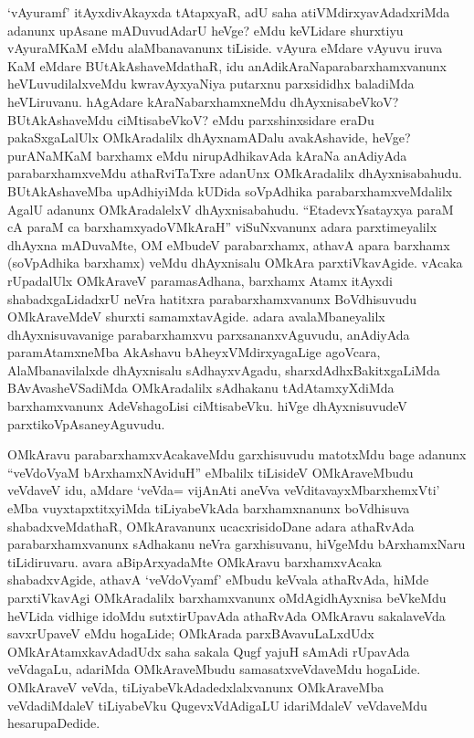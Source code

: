 \begin{artha}
`vAyuramf' itAyxdivAkayxda tAtapxyaR, adU saha atiVMdirxyavAdadxriMda adanunx upAsane mADuvudAdarU heVge? eMdu keVLidare shurxtiyu vAyuraMKaM eMdu alaMbanavanunx tiLiside. vAyura eMdare vAyuvu iruva KaM eMdare BUtAkAshaveMdathaR, idu anAdikAraNaparabarxhamxvanunx heVLuvudilalxveMdu kwravAyxyaNiya putarxnu parxsididhx baladiMda heVLiruvanu. hAgAdare kAraNabarxhamxneMdu dhAyxnisabeVkoV? BUtAkAshaveMdu ciMtisabeVkoV? eMdu parxshinxsidare eraDu pakaSxgaLalUlx OMkAradalilx dhAyxnamADalu avakAshavide, heVge? purANaMKaM barxhamx eMdu nirupAdhikavAda kAraNa anAdiyAda parabarxhamxveMdu athaRviTaTxre adanUnx OMkAradalilx dhAyxnisabahudu. BUtAkAshaveMba upAdhiyiMda kUDida soVpAdhika parabarxhamxveMdalilx AgalU adanunx OMkAradalelxV dhAyxnisabahudu. ``EtadevxYsatayxya paraM cA paraM ca barxhamxyadoVMkAraH'' viSuNxvanunx adara parxtimeyalilx dhAyxna mADuvaMte, OM eMbudeV parabarxhamx, athavA apara barxhamx (soVpAdhika barxhamx) veMdu dhAyxnisalu OMkAra parxtiVkavAgide. vAcaka rUpadalUlx OMkAraveV paramasAdhana, barxhamx Atamx itAyxdi shabadxgaLidadxrU neVra hatitxra parabarxhamxvanunx BoVdhisuvudu OMkAraveMdeV shurxti samamxtavAgide. adara avalaMbaneyalilx dhAyxnisuvavanige parabarxhamxvu parxsananxvAguvudu, anAdiyAda paramAtamxneMba AkAshavu bAheyxVMdirxyagaLige agoVcara, AlaMbanavilalxde dhAyxnisalu sAdhayxvAgadu, sharxdAdhxBakitxgaLiMda BAvAvasheVSadiMda OMkAradalilx sAdhakanu tAdAtamxyXdiMda barxhamxvanunx AdeVshagoLisi ciMtisabeVku. hiVge dhAyxnisuvudeV parxtikoVpAsaneyAguvudu.
\end{artha}

\begin{artha}
OMkAravu  parabarxhamxvAcakaveMdu garxhisuvudu matotxMdu bage adanunx  ``veVdoV\s yaM bArxhamxNAviduH'' eMbalilx tiLisideV OMkAraveMbudu veVdaveV idu, aMdare `veVda= vijAnAti aneVva veVditavayxMbarxhemxVti' eMba vuyxtapxtitxyiMda tiLiyabeVkAda barxhamxnanunx boVdhisuva shabadxveMdathaR, OMkAravanunx ucacxrisidoDane adara athaRvAda parabarxhamxvanunx sAdhakanu neVra garxhisuvanu, hiVgeMdu bArxhamxNaru tiLidiruvaru. avara aBipArxyadaMte OMkAravu barxhamxvAcaka shabadxvAgide, athavA `veVdoV\s yamf' eMbudu keVvala athaRvAda, hiMde parxtiVkavAgi OMkAradalilx barxhamxvanunx oMdAgidhAyxnisa beVkeMdu heVLida vidhige idoMdu sutxtirUpavAda athaRvAda OMkAravu sakalaveVda savxrUpaveV eMdu hogaLide; OMkArada parxBAvavuLaLxdUdx OMkArAtamxkavAdadUdx saha sakala Qugf yajuH sAmAdi rUpavAda veVdagaLu, adariMda OMkAraveMbudu samasatxveVdaveMdu hogaLide. OMkAraveV veVda, tiLiyabeVkAdadedxlalxvanunx OMkAraveMba veVdadiMdaleV tiLiyabeVku  QugevxVdAdigaLU idariMdaleV veVdaveMdu hesarupaDedide.
\end{artha}

